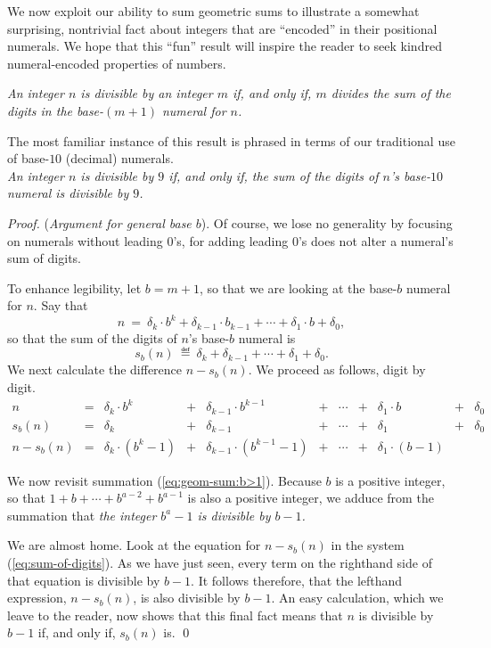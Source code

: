 \documentclass{article}
\begin{document}
\medskip


We now exploit our ability to sum geometric sums to illustrate a
somewhat surprising, nontrivial fact about integers that are
``encoded'' in their positional numerals.  We hope that this ``fun''
result will inspire the reader to seek kindred numeral-encoded
properties of numbers.

\label{thm:div-by-b-bar}
{\it
An integer $n$ is divisible by an integer $m$ if, and only if, $m$
divides the sum of the digits in the base-$(m+1)$ numeral for $n$.
}

The most familiar instance of this result is phrased in terms of our
traditional use of base-$10$ (decimal) numerals. \\
{\it An integer $n$ is divisible by $9$ if, and only if, the sum of
  the digits of $n$'s base-$10$ numeral is divisible by $9$.}

\smallskip

\begin{proof}
({\it Argument for general base $b$}).
%
Of course, we lose no generality by focusing on numerals without
leading $0$'s, for adding leading $0$'s does not alter a numeral's sum
of digits.

To enhance legibility, let $b = m+1$, so that we are looking at the
base-$b$ numeral for $n$.  Say that
\[ n \ = \ \delta_k \cdot b^k + \delta_{k-1} \cdot b_{k-1} + \cdots +
\delta_1 \cdot b + \delta_0, \]
so that the sum of the digits of $n$'s base-$b$ numeral is
\[ s_b(n) \ \eqdef \ \delta_k + \delta_{k-1} + \cdots + \delta_1 + \delta_0. \]
We next calculate the difference $n - s_b(n)$.  We proceed as
follows, digit by digit.
\begin{equation}
\label{eq:sum-of-digits}
\begin{array}{ccccccccccc}
n & = &
\delta_k \cdot b^k & + & \delta_{k-1} \cdot b^{k-1} & + & \cdots
  & + & \delta_1 \cdot b & + & \delta_0 \\
s_b(n) & = &
\delta_k & + & \delta_{k-1} & + & \cdots & + & \delta_1 & + & \delta_0 \\
\hline
n - s_b(n) & = &
\delta_k \cdot (b^k -1) & + &
\delta_{k-1} \cdot (b^{k-1} -1) & + &
\cdots & + &
\delta_1 \cdot (b-1) & & 
\end{array}
\end{equation}

We now revisit summation (\ref{eq:geom-sum:b>1}).  Because $b$ is a
positive integer, so that $1 + b + \cdots + b^{a-2} + b^{a-1}$ is also
a positive integer, we adduce from the summation that {\em the integer
  $b^a -1$ is divisible by $b-1$.}

We are almost home.  Look at the equation for $n - s_b(n)$ in the
system (\ref{eq:sum-of-digits}).  As we have just seen, every term on
the righthand side of that equation is divisible by $b-1$.  It follows
therefore, that the lefthand expression, $n - s_b(n)$, is also
divisible by $b-1$.  An easy calculation, which we leave to the
reader, now shows that this final fact means that $n$ is divisible by
$b-1$ if, and only if, $s_b(n)$ is.  \qed
\end{proof}
\end{document}
